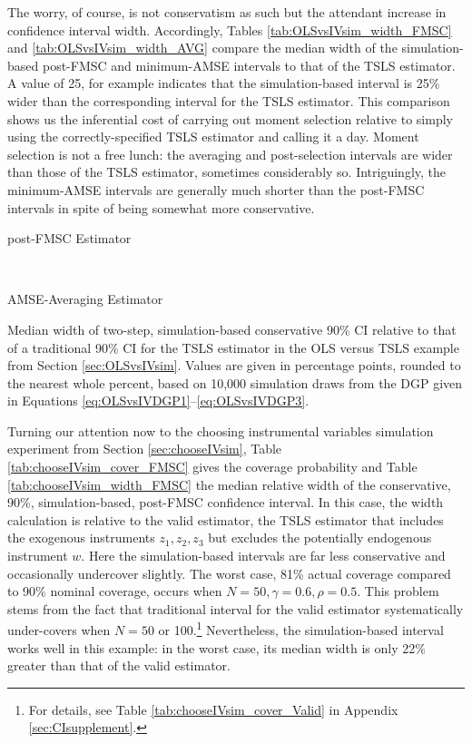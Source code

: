 The worry, of course, is not conservatism as such but the attendant increase in confidence interval width.
Accordingly, Tables \ref{tab:OLSvsIVsim_width_FMSC} and \ref{tab:OLSvsIVsim_width_AVG} compare the median width of the simulation-based post-FMSC and minimum-AMSE intervals to that of the TSLS estimator.
A value of 25, for example indicates that the simulation-based interval is 25\% wider than the corresponding interval for the TSLS estimator.
This comparison shows us the inferential cost of carrying out moment selection relative to simply using the correctly-specified TSLS estimator and calling it a day.
Moment selection is not a free lunch: the averaging and post-selection intervals are wider than those of the TSLS estimator, sometimes considerably so.
Intriguingly, the minimum-AMSE intervals are generally much shorter than the post-FMSC intervals in spite of being somewhat more conservative.

\begin{table}[h]
\footnotesize
\centering
	\begin{subtable}{0.48\textwidth}
		\caption{post-FMSC Estimator}
		
		\label{tab:OLSvsIVsim_width_FMSC}
	\end{subtable}	
	~
	\begin{subtable}{0.48\textwidth}
		\caption{AMSE-Averaging Estimator}
		
		\label{tab:OLSvsIVsim_width_AVG}
	\end{subtable}
	\caption{Median width of two-step, simulation-based conservative $90\%$ CI relative to that of a traditional 90\% CI for the TSLS estimator in the OLS versus TSLS example from Section \ref{sec:OLSvsIVsim}. Values are given in percentage points, rounded to the nearest whole percent, based on 10,000 simulation draws from the DGP given in Equations \ref{eq:OLSvsIVDGP1}--\ref{eq:OLSvsIVDGP3}.}
\end{table}

Turning our attention now to the choosing instrumental variables simulation experiment from Section \ref{sec:chooseIVsim}, Table \ref{tab:chooseIVsim_cover_FMSC} gives the coverage probability and Table \ref{tab:chooseIVsim_width_FMSC} the median relative width of the conservative, 90\%, simulation-based, post-FMSC confidence interval.
In this case, the width calculation is relative to the valid estimator, the TSLS estimator that includes the exogenous instruments $z_1, z_2, z_3$ but excludes the potentially endogenous instrument $w$.
Here  the simulation-based intervals are far less conservative and occasionally undercover slightly.
The worst case, 81\% actual coverage compared to 90\% nominal coverage, occurs when $N=50, \gamma = 0.6, \rho = 0.5$.
This problem stems from the fact that traditional interval for the valid estimator systematically under-covers when $N = 50$ or 100.\footnote{For details, see Table \ref{tab:chooseIVsim_cover_Valid} in Appendix \ref{sec:CIsupplement}.}
Nevertheless, the simulation-based interval works well in this example: in the worst case, its median width is only 22\% greater than that of the valid estimator.


